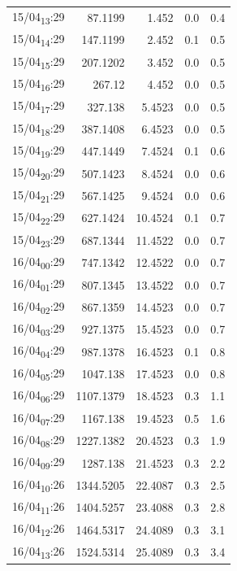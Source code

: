 \documentclass[11pt]{article}
\begin{document}
\begin{center}
\begin{tabular}{lrrrr}
15/04\textsubscript{13}:29 & 87.1199 & 1.452 & 0.0 & 0.4\\[0pt]
15/04\textsubscript{14}:29 & 147.1199 & 2.452 & 0.1 & 0.5\\[0pt]
15/04\textsubscript{15}:29 & 207.1202 & 3.452 & 0.0 & 0.5\\[0pt]
15/04\textsubscript{16}:29 & 267.12 & 4.452 & 0.0 & 0.5\\[0pt]
15/04\textsubscript{17}:29 & 327.138 & 5.4523 & 0.0 & 0.5\\[0pt]
15/04\textsubscript{18}:29 & 387.1408 & 6.4523 & 0.0 & 0.5\\[0pt]
15/04\textsubscript{19}:29 & 447.1449 & 7.4524 & 0.1 & 0.6\\[0pt]
15/04\textsubscript{20}:29 & 507.1423 & 8.4524 & 0.0 & 0.6\\[0pt]
15/04\textsubscript{21}:29 & 567.1425 & 9.4524 & 0.0 & 0.6\\[0pt]
15/04\textsubscript{22}:29 & 627.1424 & 10.4524 & 0.1 & 0.7\\[0pt]
15/04\textsubscript{23}:29 & 687.1344 & 11.4522 & 0.0 & 0.7\\[0pt]
16/04\textsubscript{00}:29 & 747.1342 & 12.4522 & 0.0 & 0.7\\[0pt]
16/04\textsubscript{01}:29 & 807.1345 & 13.4522 & 0.0 & 0.7\\[0pt]
16/04\textsubscript{02}:29 & 867.1359 & 14.4523 & 0.0 & 0.7\\[0pt]
16/04\textsubscript{03}:29 & 927.1375 & 15.4523 & 0.0 & 0.7\\[0pt]
16/04\textsubscript{04}:29 & 987.1378 & 16.4523 & 0.1 & 0.8\\[0pt]
16/04\textsubscript{05}:29 & 1047.138 & 17.4523 & 0.0 & 0.8\\[0pt]
16/04\textsubscript{06}:29 & 1107.1379 & 18.4523 & 0.3 & 1.1\\[0pt]
16/04\textsubscript{07}:29 & 1167.138 & 19.4523 & 0.5 & 1.6\\[0pt]
16/04\textsubscript{08}:29 & 1227.1382 & 20.4523 & 0.3 & 1.9\\[0pt]
16/04\textsubscript{09}:29 & 1287.138 & 21.4523 & 0.3 & 2.2\\[0pt]
16/04\textsubscript{10}:26 & 1344.5205 & 22.4087 & 0.3 & 2.5\\[0pt]
16/04\textsubscript{11}:26 & 1404.5257 & 23.4088 & 0.3 & 2.8\\[0pt]
16/04\textsubscript{12}:26 & 1464.5317 & 24.4089 & 0.3 & 3.1\\[0pt]
16/04\textsubscript{13}:26 & 1524.5314 & 25.4089 & 0.3 & 3.4\\[0pt]

\end{tabular}
\end{center}
\end{document}
